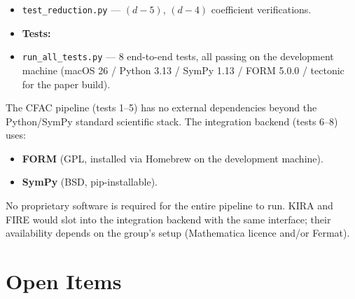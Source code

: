 \documentclass[11pt,a4paper]{article}
\theoremstyle{definition}
\theoremstyle{plain}
\begin{document}
\begin{cfacbox}
\begin{itemize}[leftmargin=2em,itemsep=2pt]
\begin{itemize}[leftmargin=1em,itemsep=1pt]
        (identifies $I[1,1,1]$ as the master).
      \item \texttt{test\_reduction.py} --- $(d-5)$, $(d-4)$
        coefficient verifications.
    \end{itemize}
\end{itemize}
\begin{itemize}[leftmargin=2em,itemsep=2pt]
  \item[] \textbf{Tests:}
  \item \texttt{run\_all\_tests.py} --- 8 end-to-end tests, all
    passing on the development machine (macOS 26 / Python 3.13 /
    SymPy 1.13 / FORM 5.0.0 / tectonic for the paper build).
\end{itemize}
\end{cfacbox}

\begin{stdbox}
The CFAC pipeline (tests 1--5) has no external dependencies beyond
the Python/SymPy standard scientific stack.  The integration
backend (tests 6--8) uses:
\begin{itemize}[leftmargin=2em]
  \item \textbf{FORM} \cite{Vermaseren2000} (GPL, installed via
    Homebrew on the development machine).
  \item \textbf{SymPy} (BSD, pip-installable).
\end{itemize}
No proprietary software is required for the entire pipeline to run.
KIRA \cite{KIRA} and FIRE \cite{FIRE} would slot into the integration
backend with the same interface; their availability depends on the
group's setup (Mathematica licence and/or Fermat).
\end{stdbox}

\section{Open Items}\label{sec:open}
\end{document}
